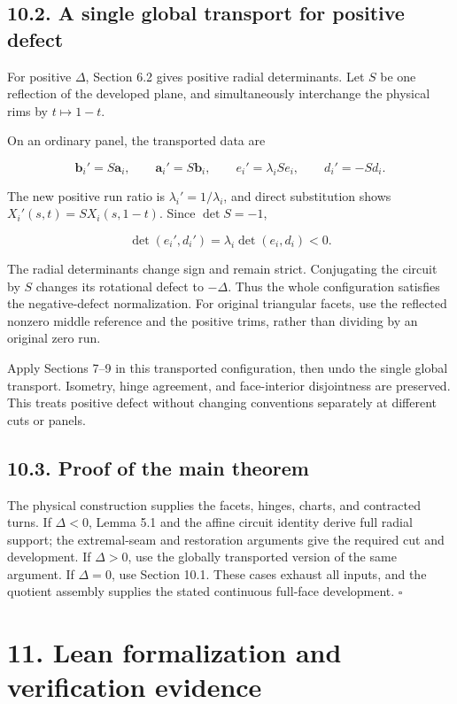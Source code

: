 \documentclass[
  11pt,
  letterpaper,
]{article}
\begin{document}
\subsection{10.2. A single global transport for positive
defect}\label{a-single-global-transport-for-positive-defect}

For positive \(\Delta\), Section 6.2 gives positive radial determinants.
Let \(S\) be one reflection of the developed plane, and simultaneously
interchange the physical rims by \(t\mapsto1-t\).

On an ordinary panel, the transported data are

\[
\mathbf b_i'=S\mathbf a_i,\qquad
\mathbf a_i'=S\mathbf b_i,\qquad
e_i'=\lambda_iSe_i,\qquad
d_i'=-Sd_i.
\tag{10.3}
\]

The new positive run ratio is \(\lambda_i'=1/\lambda_i\), and direct
substitution shows \(X_i'(s,t)=S X_i(s,1-t)\). Since \(\det S=-1\),

\[
\det(e_i',d_i')=\lambda_i\det(e_i,d_i)<0.
\]

The radial determinants change sign and remain strict. Conjugating the
circuit by \(S\) changes its rotational defect to \(-\Delta\). Thus the
whole configuration satisfies the negative-defect normalization. For
original triangular facets, use the reflected nonzero middle reference
and the positive trims, rather than dividing by an original zero run.

Apply Sections 7--9 in this transported configuration, then undo the
single global transport. Isometry, hinge agreement, and face-interior
disjointness are preserved. This treats positive defect without changing
conventions separately at different cuts or panels.

\subsection{10.3. Proof of the main
theorem}\label{proof-of-the-main-theorem}

The physical construction supplies the facets, hinges, charts, and
contracted turns. If \(\Delta<0\), Lemma 5.1 and the affine circuit
identity derive full radial support; the extremal-seam and restoration
arguments give the required cut and development. If \(\Delta>0\), use
the globally transported version of the same argument. If \(\Delta=0\),
use Section 10.1. These cases exhaust all inputs, and the quotient
assembly supplies the stated continuous full-face development.
\(\square\)

\section{11. Lean formalization and verification
evidence}\label{lean-formalization-and-verification-evidence}
\end{document}
